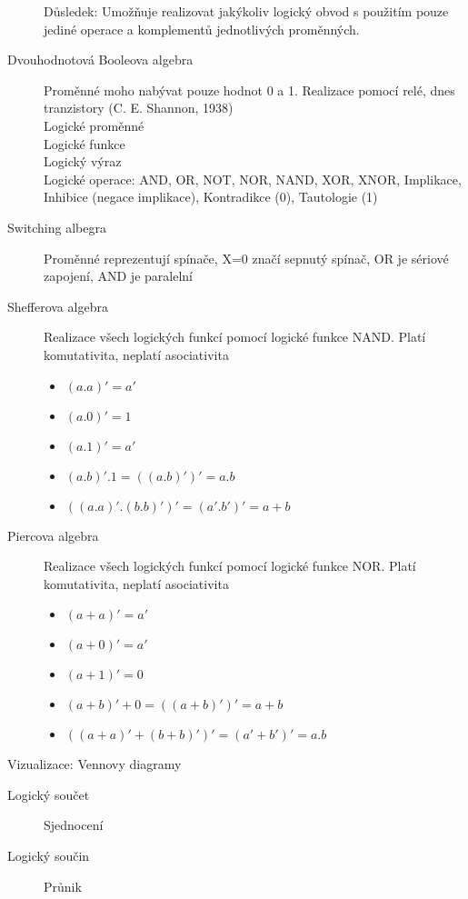 \documentclass[a4paper, 11pt]{report}
\begin{document}
\begin{description}
			Důsledek: Umožňuje realizovat jakýkoliv logický obvod s použitím pouze jediné operace a komplementů jednotlivých proměnných.
	\item[Dvouhodnotová Booleova algebra] Proměnné moho nabývat pouze hodnot 0 a 1. Realizace pomocí relé, dnes tranzistory (C. E. Shannon, 1938)\\
		Logické proměnné\\
		Logické funkce\\
		Logický výraz\\
		Logické operace: AND, OR, NOT, NOR, NAND, XOR, XNOR, Implikace, Inhibice (negace implikace), Kontradikce (0), Tautologie (1)
	\item[Switching albegra] Proměnné reprezentují spínače, X=0 značí sepnutý spínač, OR je sériové zapojení, AND je paralelní
	\item[Shefferova algebra] Realizace všech logických funkcí pomocí logické funkce NAND. Platí komutativita, neplatí asociativita
		\begin{itemize}
			\item $(a.a)' = a'$
			\item $(a.0)' = 1$
			\item $(a.1)' = a'$
			\item $(a.b)'.1 = ((a.b)')' = a . b$
			\item $((a.a)'.(b.b)')' = (a'.b')' = a + b$
		\end{itemize}
	\item[Piercova algebra] Realizace všech logických funkcí pomocí logické funkce NOR. Platí komutativita, neplatí asociativita
		\begin{itemize}
			\item $(a+a)' = a'$
			\item $(a+0)' = a'$
			\item $(a+1)' = 0$
			\item $(a+b)'+0 = ((a+b)')' = a + b$
			\item $((a+a)'+(b+b)')' = (a'+b')' = a . b$
		\end{itemize}
\end{description}


Vizualizace: Vennovy diagramy
\begin{description}
	\item[Logický součet] Sjednocení
	\item[Logický součin] Průnik
\end{description}
\end{document}
